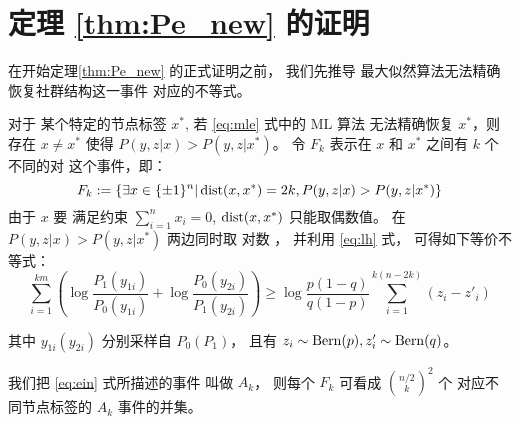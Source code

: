 \section{定理 \ref{thm:Pe_new} 的证明}

在开始定理\ref{thm:Pe_new} 的正式证明之前，
我们先推导
最大似然算法无法精确恢复社群结构这一事件
对应的不等式。

对于
某个特定的节点标签
$x^*$,
若
\eqref{eq:mle} 式中的 ML 算法
无法精确恢复 
$x^*$，则
存在 $x\neq x^*$ 使得 $P(y,z|x) > P(y,z|x^*)$。
令 $F_k$ 表示在 $x$ 和 $x^*$ 之间有 $k$ 个不同的对
这个事件，即：
    \begin{equation}\label{eq:Fk}
    F_k:=\{\exists x \in \{\pm 1\}^n |
    \operatorname{dist}(x, x^*)=2k,
    P(y,z|x) > 
    P(y,z|x^*) \}
    \end{equation}
    由于
    $x$ 要 满足约束
    $\sum_{i=1}^n x_i=0$,
    $\operatorname{dist}(x, x^*)$
    只能取偶数值。
    在
    $P(y,z|x) > P(y,z|x^*)$
    两边同时取
    对数
    ， 并利用
    \eqref{eq:lh} 式，
    可得如下等价不等式：
    \begin{equation}\label{eq:ein}
    \sum_{i=1}^{km}
    \left(\log \frac{P_1(y_{1i})}
    {P_0(y_{1i})}
    + \log \frac{P_0(y_{2i})}
    {P_1(y_{2i})}
    \right)
    \geq \log \frac{p(1-q)}{q(1-p)} \sum_{i=1}^{k(n-2k)}(z_{i} - z'_{i})
    \end{equation}
    
    其中 $y_{1i}(y_{2i})$ 分别采样自
    $P_0(P_1)$，
    且有 $z_{i} \sim \operatorname{Bern}(p), z'_{i} \sim \operatorname{Bern}(q)$。
    
    我们把 \eqref{eq:ein} 式所描述的事件
    叫做 $A_k$，
    则每个 $F_k$ 
    可看成
     $\binom{n/2}{k}^2$ 个
    对应不同节点标签的
    $A_k$ 事件的并集。
    
